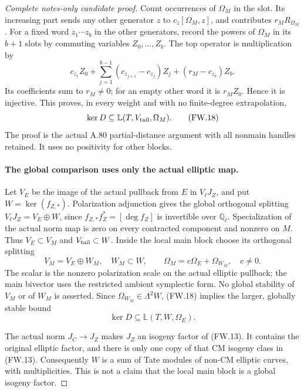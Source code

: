\begin{proof}[Complete notes-only candidate proof]
Count occurrences of \(\Omega_M\) in the slot. Its increasing
part sends any other generator \(z\) to
\(c_z[\Omega_M,z]\), and contributes \(r_M R_{\Omega_M}\).
For a fixed word \(z_1\cdots z_b\) in the other generators,
record the powers of \(\Omega_M\) in its \(b+1\) slots by
commuting variables \(Z_0,\ldots,Z_b\). The top operator is
multiplication by
\[
 c_{z_1}Z_0+\sum_{j=1}^{b-1}(c_{z_{j+1}}-c_{z_j})Z_j
                              +(r_M-c_{z_b})Z_b.       \tag{FW.17}
\]
Its coefficients sum to \(r_M\ne0\); for an empty other word
it is \(r_MZ_0\). Hence it is injective. This proves, in every
weight and with no finite-degree extrapolation,
\[
             \ker D\subseteq
                \mathbb L(T,V_{\rm tail},\Omega_M).   \tag{FW.18}
\]
The proof is the actual A.80 partial-distance argument with all
nonmain handles retained. It uses no positivity for other blocks.

\paragraph{The global comparison uses only the actual elliptic map.}
Let \(V_E\) be the image of the actual pullback from \(E\)
in \(V_\ell J_Z\), and put \(W=\ker(f_{Z,*})\).
Polarization adjunction gives the global orthogonal splitting
\(V_\ell J_Z=V_E\oplus W\), since
\(f_{Z,*}f_Z^*=[\deg f_Z]\) is invertible over \(\mathbb Q_\ell\).
Specialization of the actual norm map is zero on every contracted
component and nonzero on \(M\). Thus \(V_E\subset V_M\) and
\(V_{\rm tail}\subset W\). Inside the local main block choose
its orthogonal splitting
\[
 V_M=V_E\oplus W_M,\quad W_M\subset W,\qquad
                  \Omega_M=c\Omega_E+\Omega_{W_M},
                              \quad c\ne0.            \tag{FW.19}
\]
The scalar is the nonzero polarization scale on the actual
elliptic pullback; the main bivector uses the restricted ambient
symplectic form. No global stability of \(V_M\) or of \(W_M\)
is asserted. Since \(\Omega_{W_M}\in\Lambda^2W\), (FW.18)
implies the larger, globally stable bound
\[
                    \ker D\subseteq\mathbb L(T,W,\Omega_E).
                                                               \tag{FW.20}
\]

The actual norm \(J_C\to J_Z\) makes \(J_Z\) an isogeny
factor of (FW.13). It contains the original elliptic factor,
and there is only one copy of that CM isogeny class in (FW.13).
Consequently \(W\) is a sum of Tate modules of non-CM elliptic
curves, with multiplicities. This is not a claim that the local
main block is a global isogeny factor.


\end{proof}
